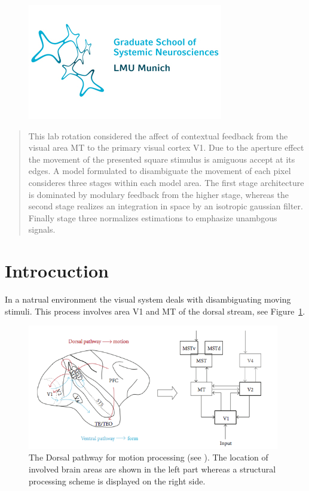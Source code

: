\documentclass[a4paper]{article}
\begin{document}
\begin{titlepage}
\begin{center}
\vspace{0.1cm}
\begin{figure}[ht]
\centering
\includegraphics[scale=0.40]{GSN}
\end{figure}
\vspace{1cm}
\end{center}

\begin{abstract}

This lab rotation considered the affect of contextual feedback from the visual area MT to the primary visual cortex V1. Due to the aperture effect the movement of the presented square stimulus is amiguous accept at its edges. A model formulated to disambiguate the movement of each pixel consideres three stages within each model area. The first stage architecture is dominated by modulary feedback from the higher stage, whereas the second stage realizes an integration in space by an isotropic gaussian filter. Finally stage three normalizes estimations to emphasize unambgous signals.
\end{abstract}
\thispagestyle{empty}
\end{titlepage}

\newpage
\tableofcontents

\newpage
\section{Introcuction}
In a natrual environment the visual system deals with disambiguating moving stimuli. This process involves area V1 and MT of the dorsal stream, see Figure~\ref{fig:bouecke1}.\\

\vspace{0.5cm}
\begin{figure}[ht]
\centering
\includegraphics[width=11cm]{bouecke1}
\caption{The Dorsal pathway for motion processing (see \cite{Bouecke10}). The location of involved brain areas are shown in the left part whereas a structural processing scheme is displayed on the right side.}
\label{fig:bouecke1}
\end{figure}
\vspace{0.5cm}
\end{document}

